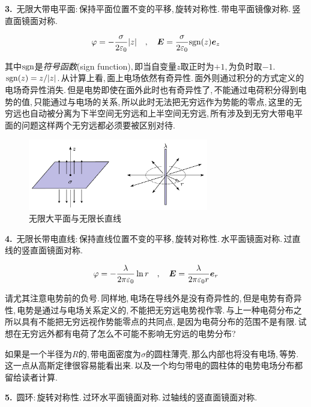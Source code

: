\vspace{0.3cm}
\textbf{3.}\, 无限大带电平面:\,保持平面位置不变的平移,\,旋转对称性.\,带电平面镜像对称.\,竖直面镜面对称.

\[\varphi =-\frac{\sigma}{2\varepsilon_0}|z| \quad,\quad \boldsymbol{E}=\frac{\sigma}{2\varepsilon_0} {\rm sgn}(z)\boldsymbol{e}_z\]

其中${\rm sgn}$是\emph{符号函数}(sign function),\,即当自变量$z$取正时为$+1$,\,为负时取$-1$.\,${\rm sgn}(z)=z/|z|$.\,从计算上看,\,面上电场依然有奇异性.\,面外则通过积分的方式定义的电场奇异性消失.\,但是电势即使在面外此时也有奇异性了,\,不能通过电荷积分得到电势的值,\,只能通过与电场的关系,\,所以此时无法把无穷远作为势能的零点,\,这里的无穷远也自动被分离为下半空间无穷远和上半空间无穷远,\,所有涉及到无穷大带电平面的问题这样两个无穷远都必须要被区别对待.



\begin{figure}[H]
\centering
\includegraphics[width=0.7\textwidth]{image/7-1-19.png}
\caption{无限大平面与无限长直线}\label{fig7-1-19}
\end{figure}

\textbf{4.}\, 无限长带电直线:\,保持直线位置不变的平移,\,旋转对称性.\,水平面镜面对称.\,过直线的竖直面镜面对称.

\[\varphi =-\frac{\lambda}{2\pi\varepsilon_0}\ln r \quad,\quad \boldsymbol{E}=\frac{\lambda}{2\pi\varepsilon_0 r}\boldsymbol{e}_r\]

请尤其注意电势前的负号.\,同样地,\,电场在导线外是没有奇异性的,\,但是电势有奇异性,\,电势是通过与电场关系定义的,\,不能把无穷远电势视作零.\,与上一种电荷分布之所以具有不能把无穷远视作势能零点的共同点,\,是因为电荷分布的范围不是有限.\,试想在无穷远外都有电荷了怎么不可能不影响无穷远的电势分布?

如果是一个半径为$R$的,\,带电面密度为$\sigma$的圆柱薄壳,\,那么内部也将没有电场,\,等势.\,这一点从高斯定律很容易能看出来.\,以及一个均匀带电的圆柱体的电势电场分布都留给读者计算.

\vspace{0.3cm}
\textbf{5.}\, 圆环:\,旋转对称性.\,过环水平面镜面对称.\,过轴线的竖直面镜面对称.

